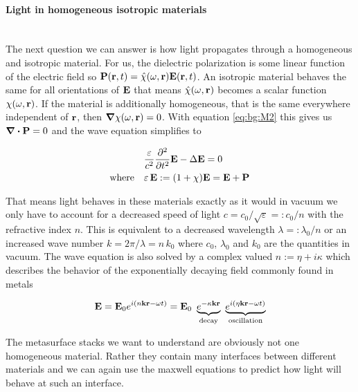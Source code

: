 \paragraph{Light in homogeneous isotropic materials}~\\
\label{par:light_in_materials}The next question we can answer is how light propagates through a homogeneous and isotropic material. For us, the dielectric polarization is some linear function of the electric field so $\vb P(\vb r, t) = \hat{\chi}(\omega, \vb r) \vb E(\vb r, t)$. An isotropic material behaves the same for all orientations of $\vb E$ that means $\hat{\chi}(\omega, \vb r)$ becomes a scalar function $\chi(\omega, \vb r)$. If the material is additionally homogeneous, that is the same everywhere independent of $\vb r$, then $\grad \chi(\omega, \vb r) = 0$. With equation \eqref{eq:bg:M2} this gives us $\div \vb P = 0$
and the wave equation simplifies to

\begin{equation}
\begin{aligned}
    &\frac{\varepsilon}{c^2} \pdv[2] t \vb E - \Delta \vb E = 0\\
    \qq*{where} &\varepsilon \, \vb E := \qty(1 + \chi) \vb E = \vb E + \vb P
\end{aligned}
\end{equation}

That means light behaves in these materials exactly as it would in vacuum we only have to account for a decreased speed of light
$c = {c_0} / {\sqrt{\varepsilon}} =: {c_0} / {n}$
with the refractive index $n$.
This is equivalent to a decreased wavelength
$\lambda =: {\lambda_0} / {n}$
or an increased wave number
$k = {2 \pi} / {\lambda} = n \, k_0$
where $c_0$, $\lambda_0$ and $k_0$ are the quantities in vacuum.
The wave equation is also solved by a complex valued $n := \eta + i \kappa$ which describes the behavior of the exponentially decaying field commonly found in metals 

\begin{equation}
    \vb E = \vb E_0 e^{i(n \vb k \vb r - \omega t)}
    = \vb E_0 \
    \underbrace{e^{-\kappa \vb k \vb r}}_{\mathrm{
    decay}} \
    \underbrace{e^{i(\eta \vb k \vb r - \omega t)}}_{\mathrm{
    oscillation}}
\end{equation}

The metasurface stacks we want to understand are obviously not one homogeneous material. Rather they contain many interfaces between different materials and we can again use the maxwell equations to predict how light will behave at such an interface.
\\

